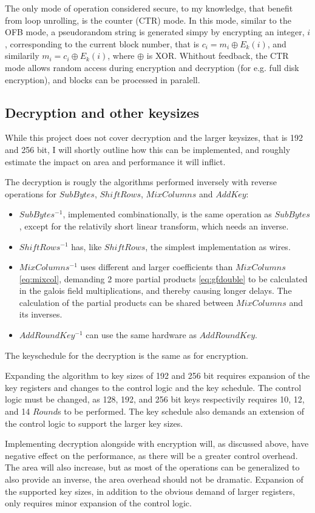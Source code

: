 The only mode of operation considered secure, to my knowledge, that
benefit from loop unrolling, is the counter (CTR) mode. In this mode,
similar to the OFB mode, a pseudorandom string is generated simpy by
encrypting an integer, $i$, corresponding to the current block number,
that is $c_i = m_i \oplus E_k(i)$, and similarily $m_i = c_i \oplus
E_k(i)$, where $\oplus$ is XOR. Whithout feedback, the CTR mode allows
random access during encryption and decryption (for e.g. full disk
encryption), and blocks can be processed in paralell.

\subsection{Decryption and other keysizes}

While this project does not cover decryption and the larger keysizes,
that is 192 and 256 bit, I will shortly outline how this can be
implemented, and roughly estimate the impact on area and performance
it will inflict.

The decryption is rougly the algorithms performed inversely with
reverse operations for $SubBytes$, $ShiftRows$, $MixColumns$ and
$AddKey$: 
\begin{itemize}
  \item $SubBytes^{-1}$, implemented combinationally, is the same
    operation as $SubBytes$, except for the relativily short linear
    transform, which needs an inverse. 
  \item $ShiftRows^{-1}$ has, like $ShiftRows$, the simplest
    implementation as wires. 
  \item $MixColumns^{-1}$ uses different and larger coefficients
    than $MixColumns$ \eqref{eq:mixcol}, demanding 2 more partial
    products \eqref{eq:gfdouble} to be calculated in the
    galois field multiplications, and thereby causing longer
    delays. The calculation of the partial products can be shared
    between $MixColumns$ and its inverses. 
  \item $AddRoundKey^{-1}$ can use the same hardware as
    $AddRoundKey$. 
\end{itemize}
The keyschedule for the decryption is the same as for encryption.

Expanding the algorithm to key sizes of 192 and 256 bit requires
expansion of the key registers and changes to the control logic and
the key schedule. The control logic must be changed, as 128, 192, and
256 bit keys respectivily requires 10, 12, and 14 $Round$s to be
performed. The key schedule also demands an extension of the control
logic to support the larger key sizes.

Implementing decryption alongside with encryption will, as discussed
above, have negative effect on the performance, as there will be a
greater control overhead. The area will also increase, but as most of
the operations can be generalized to also provide an inverse, the area
overhead should not be dramatic. Expansion of the supported key sizes,
in addition to the obvious demand of larger registers, only requires
minor expansion of the control logic.
